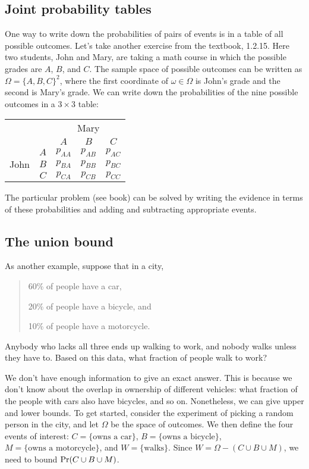 \subsection{Joint probability tables}

One way to write down the probabilities of pairs of events is in a table of all possible outcomes. Let's take another exercise from the textbook, 1.2.15. Here two students, John and Mary, are taking a math course in which the possible grades are $A$, $B$, and $C$. The sample space of possible outcomes can be written as $\Omega = \{A,B,C\}^2$, where the first coordinate of $\omega \in \Omega$ is John's grade and the second is Mary's grade. We can write down the probabilities of the nine possible outcomes in a $3 \times 3$ table:

\begin{center}
\begin{tabular}{|cc|ccc|} \hline
\multicolumn{2}{|c|}{} & \multicolumn{3}{c|}{Mary} \\ 
\multicolumn{2}{|c|}{} & $A$ & $B$ & $C$ \\ \hline
\multirow{3}{*}{John} & $A$ & $p_{AA}$ & $p_{AB}$ & $p_{AC}$ \\ 
                      & $B$ & $p_{BA}$ & $p_{BB}$ & $p_{BC}$ \\ 
                      & $C$ & $p_{CA}$ & $p_{CB}$ & $p_{CC}$ \\ \hline
\end{tabular} 
\end{center}

\noindent
The particular problem (see book) can be solved by writing the evidence in terms of these probabilities and adding and subtracting appropriate events.

\subsection{The union bound}

As another example, suppose that in a city,
\begin{quote}
60\% of people have a car,

20\% of people have a bicycle, and

10\% of people have a motorcycle.
\end{quote}
Anybody who lacks all three ends up walking to work, and nobody walks unless they have to. Based on this data, what fraction of people walk to work?

We don't have enough information to give an exact answer. This is because we don't know about the overlap in ownership of different vehicles: what fraction of the people with cars also have bicycles, and so on. Nonetheless, we can give upper and lower bounds. To get started, consider the experiment of picking a random person in the city, and let $\Omega$ be the space of outcomes. We then define the four events of interest: $C = \{\mbox{owns a car}\}$, $B = \{\mbox{owns a bicycle}\}$, $M = \{\mbox{owns a motorcycle}\}$, and $W = \{\mbox{walks}\}$. Since $W = \Omega - (C \cup B \cup M)$, we need to bound $\mbox{\rm Pr}(C \cup B \cup M)$.


